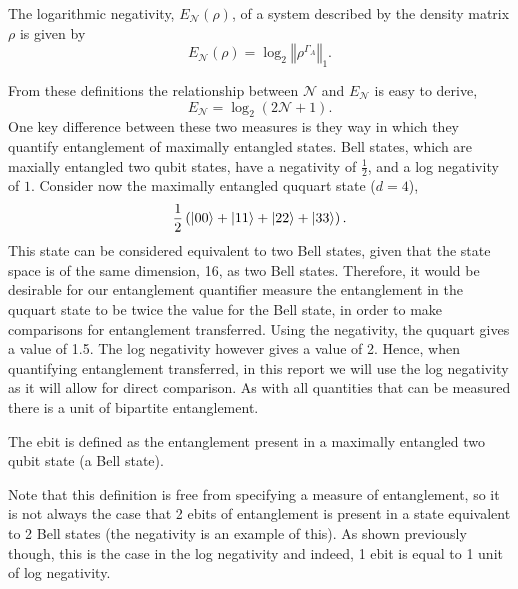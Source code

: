 \begin{definition}
    \label{definition:log_neg}
    The logarithmic negativity, $E_\mathcal{N}(\rho)$, of a system described by the density matrix $\rho$ is given by
    \begin{equation}
        E_\mathcal{N}(\rho) = \log_2\left\Vert \rho^{\Gamma_A}\right\Vert_1.
    \end{equation}
\end{definition}
From these definitions the relationship between $\mathcal{N}$ and $E_{\mathcal{N}}$ is easy to derive,
\begin{equation}
    E_\mathcal{N} = \log_2\left(2\mathcal{N} + 1\right).
\end{equation}
One key difference between these two measures is they way in which they quantify entanglement of maximally entangled states.
Bell states, which are maxially entangled two qubit states, have a negativity of $\frac{1}{2}$, and a log negativity of $1$.
Consider now the maximally entangled ququart state ($d = 4$),
\begin{equation}
    \frac{1}{2}\left(\ket{00} + \ket{11} + \ket{22} + \ket{33}\right).
\end{equation}
This state can be considered equivalent to two Bell states, given that the state space is of the same dimension, 16, as two Bell states.
Therefore, it would be desirable for our entanglement quantifier measure the entanglement in the ququart state to be twice the value for the Bell state, in order to make comparisons for entanglement transferred.
Using the negativity, the ququart gives a value of 1.5.
The log negativity however gives a value of 2.
Hence, when quantifying entanglement transferred, in this report we will use the log negativity as it will allow for direct comparison.
As with all quantities that can be measured there is a unit of bipartite entanglement.
\begin{definition}[Ebit]
    \label{definition:ebit}
    The ebit is defined as the entanglement present in a maximally entangled two qubit state (a Bell state).
\end{definition}
Note that this definition is free from specifying a measure of entanglement, so it is not always the case that 2 ebits of entanglement is present in a state equivalent to 2 Bell states (the negativity is an example of this).
As shown previously though, this is the case in the log negativity and indeed, 1 ebit is equal to 1 unit of log negativity.

